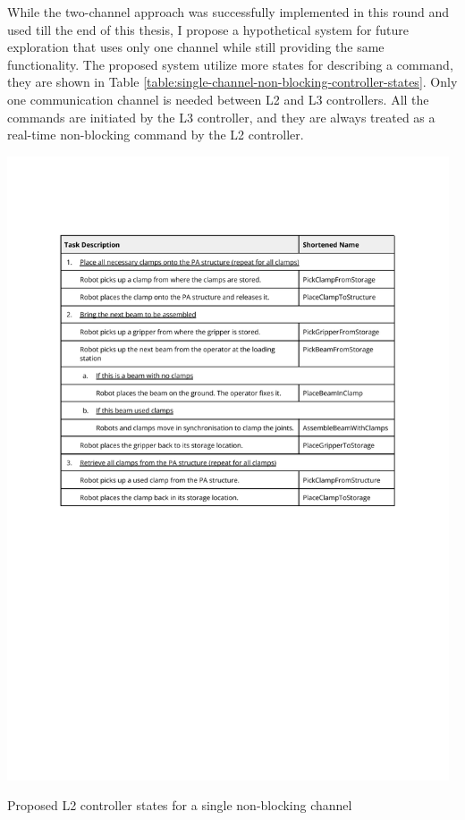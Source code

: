 While the two-channel approach was successfully implemented in this round and used till the end of this thesis, I propose a hypothetical system for future exploration that uses only one channel while still providing the same functionality.
The proposed system utilize more states for describing a command, they are shown in Table \ref{table:single-channel-non-blocking-controller-states}. Only one communication channel is needed between L2 and L3 controllers. All the commands are initiated by the L3 controller, and they are always treated as a real-time non-blocking command by the L2 controller.

\begin{table}[!h]
    \includegraphics[page=9, trim=25.4mm 175mm 25.4mm 33mm, clip, width=0.98\textwidth]{tables/Tables in Chapter 6.pdf}
    \caption{Proposed L2 controller states for a single non-blocking channel}
    \label{table:single-channel-non-blocking-controller-states}
\end{table}


